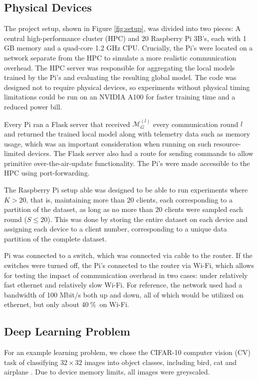 \documentclass{article}
\newcommand{\unit}[1]{\ensuremath{\:\text{#1}}}
\newcommand{\pro}{\ensuremath{\unit{\%{}}}}
\begin{document}
\subsection{Physical Devices}
The project setup, shown in Figure \ref{fig:setup}, was divided into two pieces: A central high-performance cluster (HPC) and 20 Raspberry Pi 3B's, each with 1 GB memory and a quad-core 1.2 GHz CPU.
Crucially, the Pi's were located on a network separate from the HPC to simulate a more realistic communication overhead.
The HPC server was responsible for aggregating the local models trained by the Pi's and evaluating the resulting global model.
The code was designed not to require physical devices, so experiments without physical timing limitations could be run on an NVIDIA A100 for faster training time and a reduced power bill.

Every Pi ran a Flask server that received $\mathcal M_G^{(l)}$ every communication round $l$ and returned the trained local model along with telemetry data such as memory usage, which was an important consideration when running on such resource-limited devices.
The Flask server also had a route for sending commands to allow primitive over-the-air-update functionality.
The Pi's were made accessible to the HPC using port-forwarding.

The Raspberry Pi setup able was designed to be able to run experiments where $K > 20$, that is, maintaining more than 20 clients, each corresponding to a partition of the dataset, as long as no more than 20 clients were sampled each round ($S \leq 20$).
This was done by storing the entire dataset on each device and assigning each device to a client number, corresponding to a unique data partition of the complete dataset.

 Pi was connected to a switch, which was connected via cable to the router.
If the switches were turned off, the Pi's connected to the router via Wi-Fi, which allows for testing the impact of communication overhead in two cases: under relatively fast ethernet and relatively slow Wi-Fi.
For reference, the network used had a bandwidth of 100 Mbit/s both up and down, all of which would be utilized on ethernet, but only about 40\pro\ on Wi-Fi.

\subsection{Deep Learning Problem}
For an example learning problem, we chose the CIFAR-10 computer vision (CV) task of classifying $32\times 32$ images into object classes, including bird, cat and airplane \cite{alex2009learning}.
Due to device memory limits, all images were greyscaled.
\end{document}
